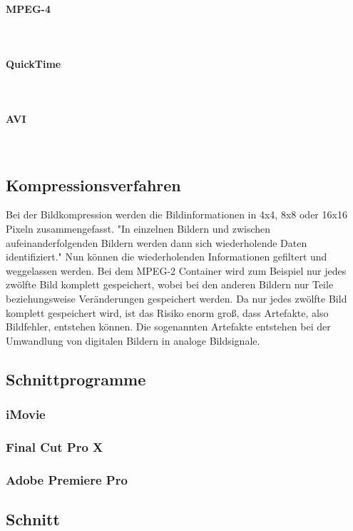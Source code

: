 \paragraph{MPEG-4}
\leavevmode \\

\paragraph{QuickTime}
\leavevmode \\

\paragraph{AVI}
\leavevmode \\
\subsection{Kompressionsverfahren}
Bei der Bildkompression werden die Bildinformationen in 4x4, 8x8 oder 16x16 Pixeln zusammengefasst. "In einzelnen Bildern und zwischen aufeinanderfolgenden Bildern werden dann sich wiederholende Daten identifiziert." Nun können die wiederholenden Informationen gefiltert und weggelassen werden. Bei dem MPEG-2 Container wird zum Beispiel nur jedes zwölfte Bild komplett gespeichert, wobei bei den anderen Bildern nur Teile beziehungsweise Veränderungen gespeichert werden. Da nur jedes zwölfte Bild komplett gespeichert wird, ist das Risiko enorm groß, dass Artefakte, also Bildfehler, entstehen können. Die sogenannten Artefakte entstehen bei der Umwandlung von digitalen Bildern in analoge Bildsignale. 
\subsection{Schnittprogramme}
\subsubsection{iMovie}
\subsubsection{Final Cut Pro X}
\subsubsection{Adobe Premiere Pro}
\subsection{Schnitt}
